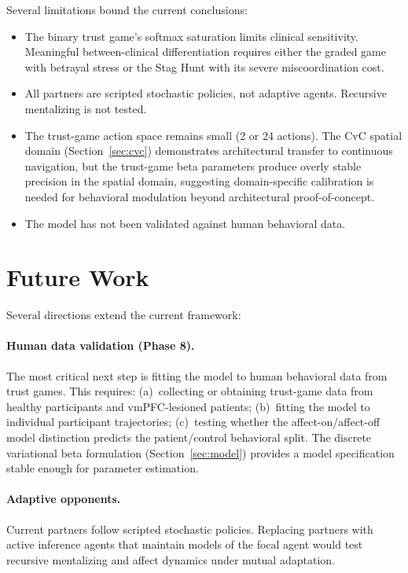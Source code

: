 \documentclass[11pt,a4paper]{article}
\begin{document}
Several limitations bound the current conclusions:
\begin{itemize}[nosep]
  \item The binary trust game's softmax saturation limits clinical sensitivity. Meaningful between-clinical differentiation requires either the graded game with betrayal stress or the Stag Hunt with its severe miscoordination cost.
  \item All partners are scripted stochastic policies, not adaptive agents. Recursive mentalizing is not tested.
  \item The trust-game action space remains small (2 or 24 actions). The CvC spatial domain (Section~\ref{sec:cvc}) demonstrates architectural transfer to continuous navigation, but the trust-game beta parameters produce overly stable precision in the spatial domain, suggesting domain-specific calibration is needed for behavioral modulation beyond architectural proof-of-concept.
  \item The model has not been validated against human behavioral data.
\end{itemize}

\section{Future Work}
\label{sec:future}

Several directions extend the current framework:

\paragraph{Human data validation (Phase 8).}
The most critical next step is fitting the model to human behavioral data from trust games. This requires: (a)~collecting or obtaining trust-game data from healthy participants and vmPFC-lesioned patients; (b)~fitting the model to individual participant trajectories; (c)~testing whether the affect-on/affect-off model distinction predicts the patient/control behavioral split. The discrete variational beta formulation (Section~\ref{sec:model}) provides a model specification stable enough for parameter estimation.

\paragraph{Adaptive opponents.}
Current partners follow scripted stochastic policies. Replacing partners with active inference agents that maintain models of the focal agent would test recursive mentalizing and affect dynamics under mutual adaptation.
\end{document}
